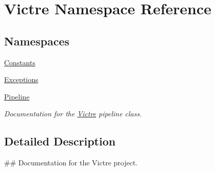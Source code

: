 \hypertarget{namespaceVictre}{\section{Victre Namespace Reference}
\label{namespaceVictre}
}
\subsection*{Namespaces}
\begin{DoxyCompactItemize}
\item 
\hyperlink{namespaceVictre_1_1Constants}{Constants}
\item 
\hyperlink{namespaceVictre_1_1Exceptions}{Exceptions}
\item 
\hyperlink{namespaceVictre_1_1Pipeline}{Pipeline}
\begin{DoxyCompactList}\small\item\em Documentation for the \hyperlink{namespaceVictre}{Victre} pipeline class. \end{DoxyCompactList}\end{DoxyCompactItemize}


\subsection{Detailed Description}
\begin{DoxyVerb}## Documentation for the Victre project.
\end{DoxyVerb}
 
